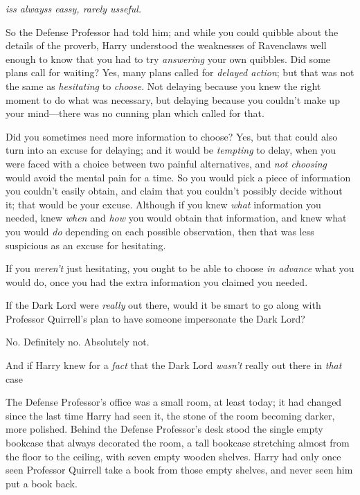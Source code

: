 
\emph{iss alwayss eassy, rarely usseful.}

So the Defense Professor had told him; and while you could quibble about the
details of the proverb, Harry understood the weaknesses of Ravenclaws well
enough to know that you had to try \emph{answering} your own quibbles. Did some
plans call for waiting? Yes, many plans called for \emph{delayed action}; but
that was not the same as \emph{hesitating} to \emph{choose}. Not delaying
because you knew the right moment to do what was necessary, but delaying
because you couldn't make up your mind---there was no cunning plan which called
for that.

Did you sometimes need more information to choose? Yes, but that could also
turn into an excuse for delaying; and it would be \emph{tempting} to delay,
when you were faced with a choice between two painful alternatives, and
\emph{not choosing} would avoid the mental pain for a time. So you would pick a
piece of information you couldn't easily obtain, and claim that you couldn't
possibly decide without it; that would be your excuse. Although if you knew
\emph{what} information you needed, knew \emph{when} and \emph{how} you would
obtain that information, and knew what you would \emph{do} depending on each
possible observation, then that was less suspicious as an excuse for hesitating.

If you \emph{weren't} just hesitating, you ought to be able to choose \emph{in
advance} what you would do, once you had the extra information you claimed you
needed.

If the Dark Lord were \emph{really} out there, would it be smart to go along
with Professor Quirrell's plan to have someone impersonate the Dark Lord?

No. Definitely no. Absolutely not.

And if Harry knew for a \emph{fact} that the Dark Lord \emph{wasn't} really out
there{\el} in \emph{that} case{\el}

The Defense Professor's office was a small room, at least today; it had changed
since the last time Harry had seen it, the stone of the room becoming darker,
more polished. Behind the Defense Professor's desk stood the single empty
bookcase that always decorated the room, a tall bookcase stretching almost from
the floor to the ceiling, with seven empty wooden shelves. Harry had only once
seen Professor Quirrell take a book from those empty shelves, and never seen
him put a book back.

